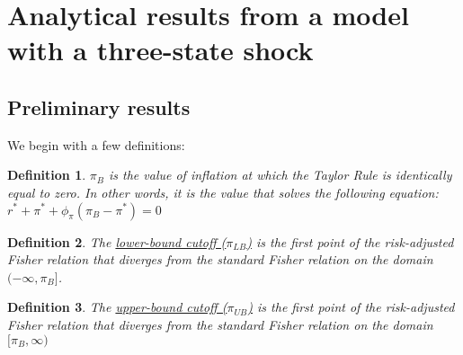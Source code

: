 \documentclass[11pt]{article}
\newtheorem{definition}{Definition}
\begin{document}
	\section{Analytical results from a model with a three-state shock}
	\label{S:AnalyticalResults}

	\subsection{Preliminary results}	
	We begin with a few definitions: 
	\begin{definition}
		$\pi_{B}$ is the value of inflation at which the Taylor Rule is identically equal to zero. In other words, it is the value that solves the following equation: $r^* + \pi^* + \phi_{\pi}(\pi_B - \pi^*) = 0$
	\end{definition}
	\begin{definition}
		The \underline{lower-bound cutoff ($\pi_{LB}$)} is the first point of the risk-adjusted Fisher relation that diverges from the standard Fisher relation on the domain $(-\infty, \pi_{B}]$.
	\end{definition}
	\begin{definition}
		The \underline{upper-bound cutoff ($\pi_{UB}$)} is the first point of the risk-adjusted Fisher relation that diverges from the standard Fisher relation on the domain $[\pi_{B},\infty)$
	\end{definition}
		
\end{document}
